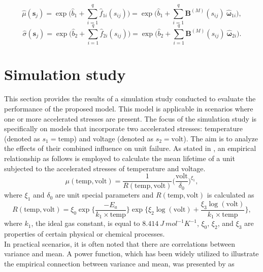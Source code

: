 \documentclass[twoside]{article}
\begin{document}
\begin{equation} \label{eq3.2}
\hat{\mu}(\boldsymbol{s}_{j}) = \exp\Big(\hat{b}_{1} + \sum_{i=1}^{q}\hat{f}_{1i}(s_{ij}) \Big) 
=\exp\Big(\hat{b}_{1} + \sum_{i=1}^{q}\boldsymbol{B}^{(M)}(s_{ij})\: \hat{\boldsymbol{\omega}}_{1i} \Big),             
\end{equation}
\begin{equation}\label{eq3.3}
 \hat{\sigma}(\boldsymbol{s}_{j})=\exp\Big(\hat{b}_{2} + \sum_{i=1}^{q}\hat{f}_{2i}(s_{ij}) \Big)
=\exp\Big(\hat{b}_{2} + \sum_{i=1}^{q}\boldsymbol{B}^{(M)}(s_{ij})\: \hat{\boldsymbol{\omega}}_{2i} \Big). 
\end{equation}

\section{Simulation study}\label{sec4}
This section provides the results of a simulation study conducted to evaluate the performance of the proposed model. This model is applicable in scenarios where one or more accelerated stresses are present. The focus of the simulation study is specifically on models that incorporate two accelerated stresses: temperature (denoted as \(s_{1} = \text{temp}\)) and voltage (denoted as \(s_{2} = \text{volt}\)). The aim is to analyze the effects of their combined influence on unit failure. As stated in \cite{Escobar:Meeker:2006}, an empirical relationship as follows is employed to calculate the mean lifetime of a unit subjected to the accelerated stresses of temperature and voltage.
\begin{equation}
\mu(\text{temp},\text{volt})=\frac{1}{R(\text{temp},\text{volt})}\big(\frac{\text{volt}}{\delta_{0}}\big)^{\xi_{1}},          
  \label{eq4.1}
\end{equation}
where $\xi_{1}$ and $\delta_{0}$ are unit special parameters and $R(\text{temp},\text{volt})$ is calculated as 
\begin{equation}
R(\text{temp},\text{volt})=\xi_{0}\exp\big\{\frac{-E_{a}}{k_{1}\times \text{temp}}\big\} \exp\big\{\xi_{2}\log(\text{volt}) + \frac{\xi_{3} \log(\text{volt})}{k_{1}\times \text{temp}}\big\},       
      \label{eq4.2}
\end{equation}
where $k_{1}$, the ideal gas constant, is equal to $8.414\: J\:mol^{-1}K^{-1}$, $\xi_{0}$, $\xi_{2}$, and $\xi_{3}$ are properties of certain physical or chemical processes.\\
In practical scenarios, it is often noted that there are correlations between variance and mean. A power function, which has been widely utilized to illustrate the empirical connection between variance and mean, was presented by \cite{Taylor:1961} as
\end{document}
